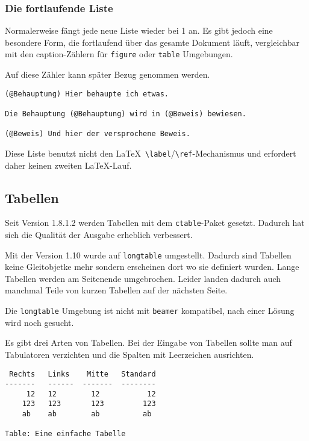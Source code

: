 \documentclass[11pt,ngerman,a4paper]{article}
\begin{document}
\subsubsection{Die fortlaufende Liste}

Normalerweise fängt jede neue Liste wieder bei 1 an. Es gibt jedoch eine
besondere Form, die fortlaufend über das gesamte Dokument läuft,
vergleichbar mit den caption-Zählern für \texttt{figure} oder
\texttt{table} Umgebungen.

Auf diese Zähler kann später Bezug genommen werden.

\begin{verbatim}
(@Behauptung) Hier behaupte ich etwas.

Die Behauptung (@Behauptung) wird in (@Beweis) bewiesen.

(@Beweis) Und hier der versprochene Beweis. 
\end{verbatim}

Diese Liste benutzt nicht den
LaTeX~\texttt{\textbackslash{}label}/\texttt{\textbackslash{}ref}-Mechanismus
und erfordert daher keinen zweiten LaTeX-Lauf.

\subsection{Tabellen}

Seit Version 1.8.1.2 werden Tabellen mit dem \texttt{ctable}-Paket
gesetzt. Dadurch hat sich die Qualität der Ausgabe erheblich verbessert.

Mit der Version 1.10 wurde auf \texttt{longtable} umgestellt. Dadurch
sind Tabellen keine Gleitobjetke mehr sondern erscheinen dort wo sie
definiert wurden. Lange Tabellen werden am Seitenende umgebrochen.
Leider landen dadurch auch manchmal Teile von kurzen Tabellen auf der
nächsten Seite.

Die \texttt{longtable} Umgebung ist nicht mit \texttt{beamer}
kompatibel, nach einer Lösung wird noch gesucht.

Es gibt drei Arten von Tabellen. Bei der Eingabe von Tabellen sollte man
auf Tabulatoren verzichten und die Spalten mit Leerzeichen ausrichten.

\begin{verbatim}
 Rechts   Links    Mitte   Standard
-------   ------  -------  --------
     12   12        12           12
    123   123       123         123
    ab    ab        ab          ab

Table: Eine einfache Tabelle
\end{verbatim}
\end{document}
